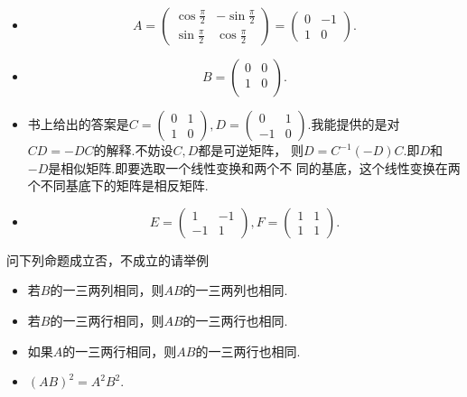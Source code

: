﻿\documentclass{book} \usepackage{exsheets} \usepackage{xeCJK}
\begin{document}
\begin{solution}
  \begin{itemize}
  \item
$$
A=
\begin{pmatrix}
  \cos \frac{\pi}{2}&-\sin \frac{\pi}{2}\\
  \sin \frac{\pi}{2}&\cos \frac{\pi}{2}
\end{pmatrix}=
\begin{pmatrix}
  0&-1\\
  1&0
\end{pmatrix}.
$$
\item
$$
B=
\begin{pmatrix}
  0&0\\
  1&0\\
\end{pmatrix}.
$$
\item 书上给出的答案是$C=
  \begin{pmatrix}
    0&1\\
    1&0
  \end{pmatrix},D=
  \begin{pmatrix}
    0&1\\
    -1&0
  \end{pmatrix}.
  $我能提供的是对$CD=-DC$的解释.不妨设$C,D$都是可逆矩阵，
  则$D=C^{-1}(-D)C$.即$D$和$-D$是相似矩阵.即要选取一个线性变换和两个不
  同的基底，这个线性变换在两个不同基底下的矩阵是相反矩阵.
\item
$$
E=
\begin{pmatrix}
  1&-1\\
  -1&1
\end{pmatrix},F=
\begin{pmatrix}
  1&1\\
  1&1
\end{pmatrix}.
$$
\end{itemize}
\end{solution}
\begin{question}
  问下列命题成立否，不成立的请举例
  \begin{itemize}
  \item 若$B$的一三两列相同，则$AB$的一三两列也相同.
  \item 若$B$的一三两行相同，则$AB$的一三两行也相同.
  \item 如果$A$的一三两行相同，则$AB$的一三两行也相同.
  \item $(AB)^2=A^2B^2$.
  \end{itemize}
\end{question}
\end{document}
